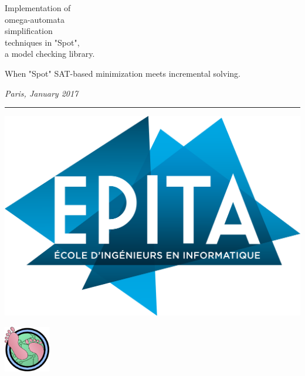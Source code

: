 \begin{titlepage}
\noindent \titlefont Implementation of \\
omega-automata \\
simplification \\
techniques in "Spot", \\
a model checking library.\par
\epigraph{When "Spot" SAT-based minimization meets incremental solving.}%
{\textit{Paris, January 2017}}
\null\vfill
\vspace*{1cm}
\noindent
\hfill%
%
\noindent\begin{minipage}{0.7\textwidth}
    \begin{flushright}
        \printauthor
    \end{flushright}
\end{minipage}%
%
\begin{minipage}{0.1\linewidth}%
  \hspace{0.5cm}%
  \rule{5pt}{200pt}%
\end{minipage}%
%
\begin{minipage}{0.3\textwidth}%
  \includegraphics[width=\linewidth]{./img/epita.png} \\%
  \begin{center}%
    \includegraphics[width=2cm]{./img/spot.png}%
  \end{center}%

\end{minipage}
\end{titlepage}
